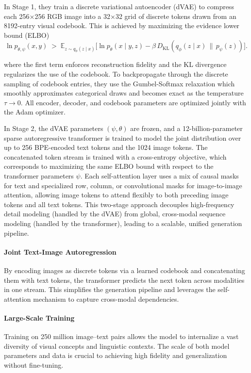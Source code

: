 \documentclass[10pt]{article}
\begin{document}
In Stage 1, they train a discrete variational autoencoder (dVAE) to compress each 256×256 RGB image into a 32×32 grid of discrete tokens drawn from an 8192-entry visual codebook. This is achieved by maximizing the evidence lower bound (ELBO)
\[
    \ln p_{\theta,\psi}(x,y)\;>\;\mathbb{E}_{z\sim q_\phi(z\mid x)}\big[\ln p_\theta(x\mid y,z)-\beta\,D_{\mathrm{KL}}(q_\phi(z\mid x)\,\|\,p_\psi(z))\big].
\]

where the first term enforces reconstruction fidelity and the KL divergence regularizes the use of the codebook. To backpropagate through the discrete sampling of codebook entries, they use the Gumbel-Softmax relaxation which smoothly approximates categorical draws and becomes exact as the temperature \(\tau \rightarrow 0\). All encoder, decoder, and codebook parameters are optimized jointly with the Adam optimizer.

In Stage 2, the dVAE parameters \((\psi, \theta)\) are frozen, and a 12-billion-parameter sparse autoregressive transformer is trained to model the joint distribution over up to 256 BPE-encoded text tokens and the 1024 image tokens. The concatenated token stream is trained with a cross-entropy objective, which corresponds to maximizing the same ELBO bound with respect to the transformer parameters \(\psi\). Each self-attention layer uses a mix of causal masks for text and specialized row, column, or convolutional masks for image-to-image attention, allowing image tokens to attend flexibly to both preceding image tokens and all text tokens. This two-stage approach decouples high-frequency detail modeling (handled by the dVAE) from global, cross-modal sequence modeling (handled by the transformer), leading to a scalable, unified generation pipeline.

\paragraph{Joint Text-Image Autoregression}
By encoding images as discrete tokens via a learned codebook and concatenating them with text tokens, the transformer predicts the next token across modalities in one stream. This simplifies the generation pipeline and leverages the self-attention mechanism to capture cross-modal dependencies.

\paragraph{Large-Scale Training}
Training on 250 million image–text pairs allows the model to internalize a vast diversity of visual concepts and linguistic contexts. The scale of both model parameters and data is crucial to achieving high fidelity and generalization without fine-tuning.
\end{document}
